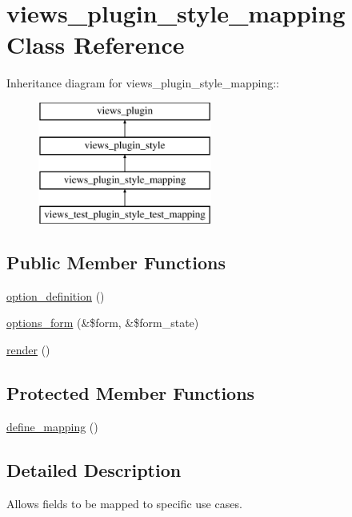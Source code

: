 \hypertarget{classviews__plugin__style__mapping}{
\section{views\_\-plugin\_\-style\_\-mapping Class Reference}
\label{classviews__plugin__style__mapping}
}
Inheritance diagram for views\_\-plugin\_\-style\_\-mapping::\begin{figure}[H]
\begin{center}
\leavevmode
\includegraphics[height=4cm]{classviews__plugin__style__mapping}
\end{center}
\end{figure}
\subsection*{Public Member Functions}
\begin{DoxyCompactItemize}
\item 
\hyperlink{classviews__plugin__style__mapping_a3d8899494e2bbb4899002d528594e3d9}{option\_\-definition} ()
\item 
\hyperlink{classviews__plugin__style__mapping_a3aa280e8dac5c6d0cdc33418bfa1736c}{options\_\-form} (\&\$form, \&\$form\_\-state)
\item 
\hyperlink{classviews__plugin__style__mapping_a0abe9d256844104b89045980cf991782}{render} ()
\end{DoxyCompactItemize}
\subsection*{Protected Member Functions}
\begin{DoxyCompactItemize}
\item 
\hyperlink{classviews__plugin__style__mapping_a283619a0ae0e76eefd0b0189126a17ed}{define\_\-mapping} ()
\end{DoxyCompactItemize}


\subsection{Detailed Description}
Allows fields to be mapped to specific use cases. 

